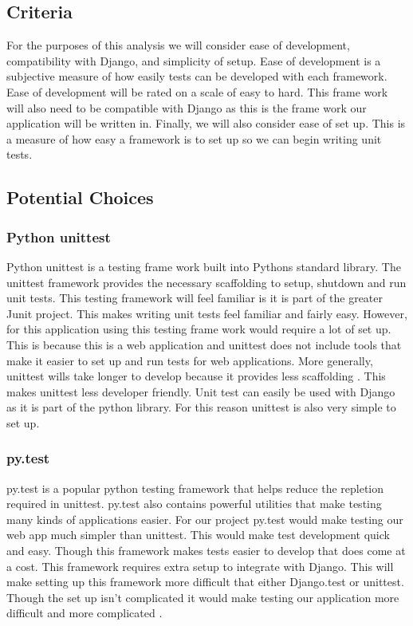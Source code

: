 \documentclass[onecolumn, draftclsnofoot,10pt, compsoc]{article}
\begin{document}
	\subsection{Criteria}
		For the purposes of this analysis we will consider ease of development, compatibility with Django, and simplicity of setup. Ease of development is a subjective measure of how easily tests can be developed with each framework. Ease of development will be rated on a scale of easy to hard. This frame work will also need to be compatible with Django as this is the frame work our application will be written in. Finally, we will also consider ease of set up. This is a measure of how easy a framework is to set up so we can begin writing unit tests.
	\subsection{Potential Choices}
		\subsubsection{Python unittest}
			Python unittest is a testing frame work built into Pythons standard library. The unittest framework provides the necessary scaffolding to setup, shutdown and run unit tests. This testing framework will feel familiar is it is part of the greater Junit project\cite{IEEEexample:unittest}. This makes writing unit tests feel familiar and fairly easy. However, for this application using this testing frame work would require a lot of set up. This is because this is a web application and unittest does not include tools that make it easier to set up and run tests for web applications. More generally, unittest wills take longer to develop because it provides less scaffolding \cite{IEEEexample:unittestVSpyTest}. This makes unittest less developer friendly. Unit test can easily be used with Django as it is part of the python library. For this reason unittest is also very simple to set up.
		\subsubsection{py.test}
			py.test is a popular python testing framework that helps reduce the repletion required in unittest. py.test also contains powerful utilities that make testing many kinds of applications easier. For our project py.test would make testing our web app much simpler than unittest. This would make test development quick and easy. Though this framework makes tests easier to develop that does come at a cost. This framework requires extra setup to integrate with Django. This will make setting up this framework more difficult that either Django.test or unittest. Though the set up isn't complicated it would make testing our application more difficult and more complicated \cite{IEEEexample:DjangoTest}.
\end{document}
